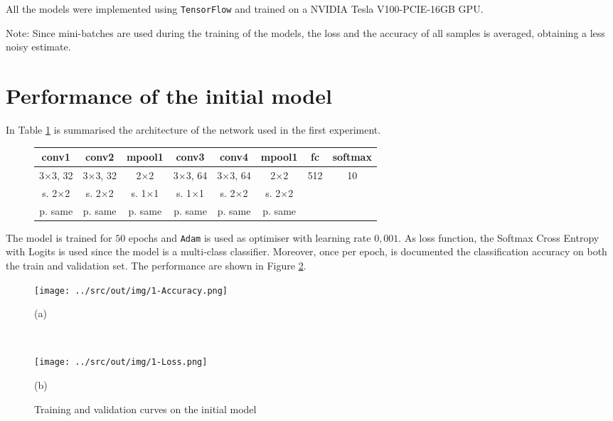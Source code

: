 \documentclass[a4paper,12pt]{article} %
\begin{document}
	All the models were implemented using \texttt{TensorFlow} and trained on a 
	NVIDIA Tesla V100-PCIE-16GB GPU.
	
	Note: Since mini-batches are used during the training of the models, the 
	loss and the accuracy of all samples is averaged, obtaining a less noisy 
	estimate.
	
	\section{Performance of the initial model}
	\label{section:model0}
	In Table \ref{tab:model0} is summarised the architecture of the network 
	used in the first experiment.	
	
	\begin{figure}[H]
		\centering
		
		\begin{tabular}{cccccccc}
		\toprule
		\textbf{conv1} & \textbf{conv2} & \textbf{mpool1} & \textbf{conv3} &
		\textbf{conv4} & \textbf{mpool1} &   \textbf{fc} &
		\textbf{softmax} \\
		\midrule
		3$\times$3,  32 & 3$\times$3, 32 & 2$\times$2 &3$\times$3, 64 & 
		3$\times$3, 64  & 2$\times$2  & 512 & 10\\
		s. 2$\times$2 &   s. 2$\times$2 &   s. 1$\times$1 & s. 1$\times$1  & s. 
		2$\times$2 & s. 2$\times$2 && \\
		p. same & p. same & p. same  & p. same & p. same & p. same &&\\
		\bottomrule
		\end{tabular}
		\label{tab:model0}
	\end{figure}
	
	The model is trained for $50$ epochs and \texttt{Adam} is used as 
	optimiser with learning rate $0,001$.
	As loss function, the Softmax Cross Entropy with Logits is used since the 
	model is a multi-class classifier. Moreover, once per epoch, is documented 
	the classification accuracy on both the train and validation set.
	The performance are shown in Figure \ref{fig:model0-performance}.
	
	\begin{figure}[H]
		\begin{minipage}[c]{.49\textwidth}
			\centering
			\texttt{[image: ../src/out/img/1-Accuracy.png]}
			\caption*{(a)}
		\end{minipage}
		~
		\begin{minipage}[c]{.49\textwidth}
			\centering
			\texttt{[image: ../src/out/img/1-Loss.png]}
			\caption*{(b)}
		\end{minipage}
		\caption{Training and validation curves on the initial model}
		\label{fig:model0-performance}
	\end{figure}
	
\end{document}
